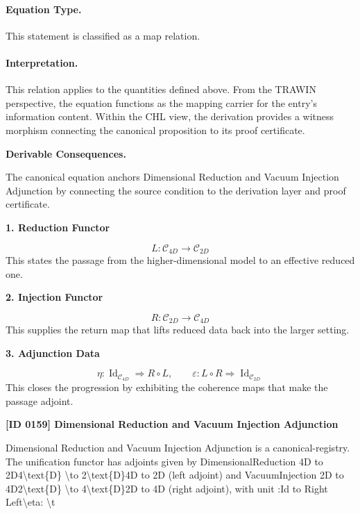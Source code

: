 \paragraph{Equation Type.}
This statement is classified as a map relation.

\paragraph{Interpretation.}
This relation applies to the quantities defined above. From the TRAWIN perspective, the equation functions as the mapping carrier for the entry’s information content. Within the CHL view, the derivation provides a witness morphism connecting the canonical proposition to its proof certificate.

\par\vspace{0.35em}
\noindent\textbf{Derivable Consequences.}\quad
\begingroup
\footnotesize
\raggedright
The canonical equation anchors Dimensional Reduction and Vacuum Injection Adjunction by connecting the source condition to the derivation layer and proof certificate.
\par\endgroup

\noindent\textbf{1. Reduction Functor}\par
\[
L:\mathcal{C}_{4D}\longrightarrow \mathcal{C}_{2D}
\]
\noindent This states the passage from the higher-dimensional model to an effective reduced one.\par
\noindent\textbf{2. Injection Functor}\par
\[
R:\mathcal{C}_{2D}\longrightarrow \mathcal{C}_{4D}
\]
\noindent This supplies the return map that lifts reduced data back into the larger setting.\par
\noindent\textbf{3. Adjunction Data}\par
\[
\eta:\operatorname{Id}_{\mathcal{C}_{4D}}\Rightarrow R\circ L,
\qquad
\varepsilon:L\circ R\Rightarrow \operatorname{Id}_{\mathcal{C}_{2D}}
\]
\noindent This closes the progression by exhibiting the coherence maps that make the passage adjoint.\par

\clearpage
\noindent\textbf{[ID 0159] Dimensional Reduction and Vacuum Injection Adjunction}\par
\vspace{0.35em}
\begingroup\small
{}
Dimensional Reduction and Vacuum Injection Adjunction is a canonical-registry. The unification functor has adjoints given by DimensionalReduction 4D to 2D4\textbackslash{}text\{D\} \textbackslash{}to 2\textbackslash{}text\{D\}4D to 2D (left adjoint) and VacuumInjection 2D to 4D2\textbackslash{}text\{D\} \textbackslash{}to 4\textbackslash{}text\{D\}2D to 4D (right adjoint), with unit  :Id to Right Left\textbackslash{}eta: \textbackslash{}t

